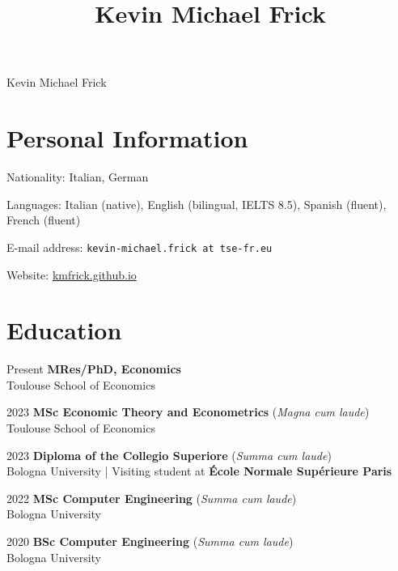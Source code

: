 \documentclass[11pt,a4paper]{article}
\title{Kevin Michael Frick}
\author{}
\begin{document}
\date{}
\thispagestyle{empty}
\setlength\cvlabelwidth{90pt}
\begin{cv}{\huge Kevin Michael Frick}
\section*{Personal Information}
\begin{cvlist}{}
	\itemsep -4pt
	\item[Nationality:] Italian, German
  \item[Languages:]  Italian (native), English (bilingual, IELTS 8.5), Spanish (fluent), French (fluent)
  \item[E-mail address:] \texttt{kevin-michael.frick at tse-fr.eu}
  \item[Website:] \url{kmfrick.github.io}
\end{cvlist}
\vspace{-22pt}
\section*{Education}
\begin{cvlist}{}
	\item[Present]
		\textbf{MRes/PhD, Economics}\\
    Toulouse School of Economics
  \item[2023]
    \textbf{MSc Economic Theory and Econometrics} (\emph{Magna cum laude})\\
    Toulouse School of Economics
  \item[2023]
    \textbf{Diploma of the Collegio Superiore} (\emph{Summa cum laude})\\
    Bologna University  |  Visiting student at \textbf{École Normale Supérieure Paris}
  \item[2022]
    \textbf{MSc Computer Engineering} (\emph{Summa cum laude})\\
    Bologna University
  \item[2020]
    \textbf{BSc Computer Engineering} (\emph{Summa cum laude})\\
    Bologna University
\end{cvlist}
\vspace{-22pt}

\end{cv}
\end{document}
